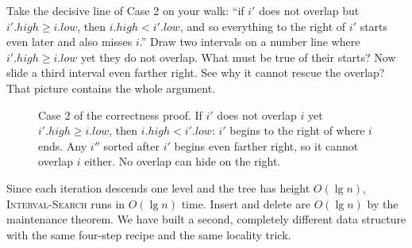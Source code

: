 \begin{walkbox}
Take the decisive line of Case 2 on your walk: ``if $i'$ does not overlap but
$i'.\mathit{high} \ge i.\mathit{low}$, then $i.\mathit{high} < i'.\mathit{low}$,
and so everything to the right of $i'$ starts even later and also misses $i$.''
Draw two intervals on a number line where $i'.\mathit{high} \ge i.\mathit{low}$
yet they do not overlap. What must be true of their starts? Now slide a third
interval even farther right. See why it cannot rescue the overlap? That picture
contains the whole argument.
\end{walkbox}

\begin{figure}[H]
\centering
{}
\caption{Case 2 of the correctness proof. If $i'$ does not overlap $i$ yet
$i'.high\ge i.low$, then $i.high < i'.low$: $i'$ begins to the right of where
$i$ ends. Any $i''$ sorted after $i'$ begins even farther right, so it cannot
overlap $i$ either. No overlap can hide on the right.}
\label{ch14:fig-case2}
\end{figure}

Since each iteration descends one level and the tree has height $O(\lg n)$,
\textsc{Interval-Search} runs in $O(\lg n)$ time. Insert and delete are
$O(\lg n)$ by the maintenance theorem. We have built a second, completely
different data structure with the same four-step recipe and the same locality
trick.

